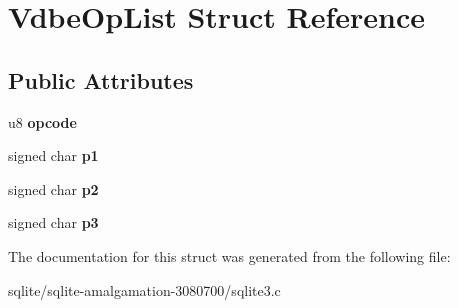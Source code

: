 \hypertarget{struct_vdbe_op_list}{\section{Vdbe\+Op\+List Struct Reference}
\label{struct_vdbe_op_list}
}
\subsection*{Public Attributes}
\begin{DoxyCompactItemize}
\item 
\hypertarget{struct_vdbe_op_list_a9c839a619aed99f91cb5e226487be7be}{u8 {\bfseries opcode}}\label{struct_vdbe_op_list_a9c839a619aed99f91cb5e226487be7be}

\item 
\hypertarget{struct_vdbe_op_list_a68641ef4313dfdfafe45b75203c49d5a}{signed char {\bfseries p1}}\label{struct_vdbe_op_list_a68641ef4313dfdfafe45b75203c49d5a}

\item 
\hypertarget{struct_vdbe_op_list_a8493431402f7f91cea81c00e311dc4e1}{signed char {\bfseries p2}}\label{struct_vdbe_op_list_a8493431402f7f91cea81c00e311dc4e1}

\item 
\hypertarget{struct_vdbe_op_list_a584cdaa02042fd5d1bc8cffbdfd9441d}{signed char {\bfseries p3}}\label{struct_vdbe_op_list_a584cdaa02042fd5d1bc8cffbdfd9441d}

\end{DoxyCompactItemize}


The documentation for this struct was generated from the following file\+:\begin{DoxyCompactItemize}
\item 
sqlite/sqlite-\/amalgamation-\/3080700/sqlite3.\+c\end{DoxyCompactItemize}
